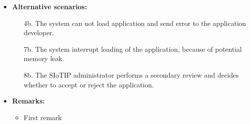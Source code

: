 \begin{itemize}
    \item \textbf{Alternative scenarios:}
    \begin{enumerate}
        \item [4b.] The system can not load application and send error 
                    to the application developer.
        \item [7b.] The system interrupt loading of the application, 
                    because of potential memory leak.
        \item [8b.] The SIoTIP administrator performs a secondary review and decides whether to accept
                    or reject the application.
    \end{enumerate}

    \item \textbf{Remarks:}
        \begin{itemize}
            \item First remark
        \end{itemize}
\end{itemize}

